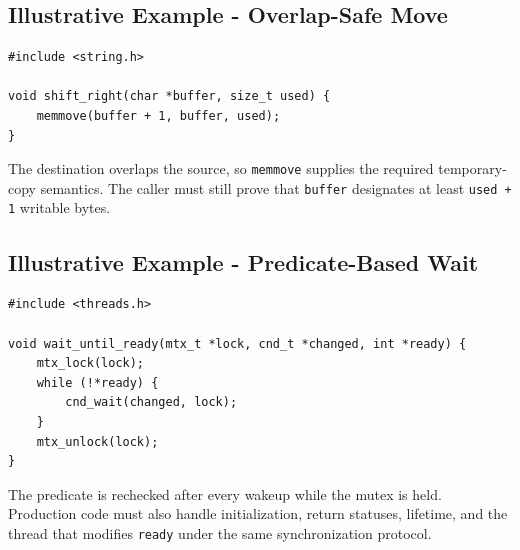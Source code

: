 \documentclass[10pt,letterpaper]{article}
\begin{document}
\subsection{Illustrative Example - Overlap-Safe Move}
\begin{verbatim}
#include <string.h>

void shift_right(char *buffer, size_t used) {
    memmove(buffer + 1, buffer, used);
}
\end{verbatim}
The destination overlaps the source, so \texttt{memmove} supplies the required temporary-copy semantics. The caller must still prove that \texttt{buffer} designates at least \texttt{used + 1} writable bytes.



\subsection{Illustrative Example - Predicate-Based Wait}
\begin{verbatim}
#include <threads.h>

void wait_until_ready(mtx_t *lock, cnd_t *changed, int *ready) {
    mtx_lock(lock);
    while (!*ready) {
        cnd_wait(changed, lock);
    }
    mtx_unlock(lock);
}
\end{verbatim}
The predicate is rechecked after every wakeup while the mutex is held. Production code must also handle initialization, return statuses, lifetime, and the thread that modifies \texttt{ready} under the same synchronization protocol.
\end{document}
